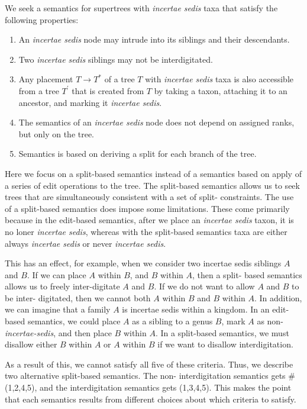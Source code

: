 \documentclass[english]{article}
\begin{document}
We seek a semantics for supertrees with \emph{incertae sedis }taxa
that satisfy the following properties:
\begin{enumerate}
    \item An \emph{incertae sedis} node may intrude into its siblings and their
descendants.
    \item Two \emph{incertae sedis} siblings may not be
interdigitated.
    \item Any placement $T\to T^{*}$ of a tree $T$ with
\emph{incertae sedis} taxa is also accessible from a tree $T^{\prime}$
that is created from $T$ by taking a taxon, attaching it to an
ancestor, and marking it \emph{incertae sedis}. 
    \item The semantics of an
\emph{incertae sedis} node does not depend on assigned ranks, but only
on the tree.
    \item Semantics is based on deriving a split for each
branch of the tree.
\end{enumerate}
Here we focus on a split-based
semantics instead of a semantics based on apply of a series of edit
operations to the tree. The split-based semantics allows us to seek
trees that are simultaneously consistent with a set of split-
constraints. The use of a split-based semantics does impose some
limitations. These come primarily because in the edit-based semantics,
after we place an \emph{incertae sedis} taxon, it is no loner
\emph{incertae sedis}, whereas with the split-based semantics taxa are
either always \emph{incertae sedis} or never \emph{incertae sedis}.

This has an effect, for example, when we consider two incertae sedis
siblings $A$ and $B$. If we can place $A$ within $B$, and $B$ within
$A$, then a split- based semantics allows us to freely inter-digitate
$A$ and $B$. If we do not want to allow $A$ and $B$ to be inter-
digitated, then we cannot both $A$ within $B$ and $B$ within $A$. In
addition, we can imagine that a family $A$ is incertae sedis within a
kingdom. In an edit-based semantics, we could place $A$ as a sibling
to a genus $B$, mark $A$ as non-\emph{incertae-sedis}, and then place
$B$ within $A$. In a split-based semantics, we must disallow either
$B$ within $A$ or $A$ within $B$ if we want to disallow
interdigitation.

As a result of this, we cannot satisfy all five of these criteria.
Thus, we describe two alternative split-based semantics. The non-
interdigitation semantics gets \# (1,2,4,5), and the interdigitation
semantics gets (1,3,4,5). This makes the point that each semantics
results from different choices about which criteria to satisfy.
\end{document}
